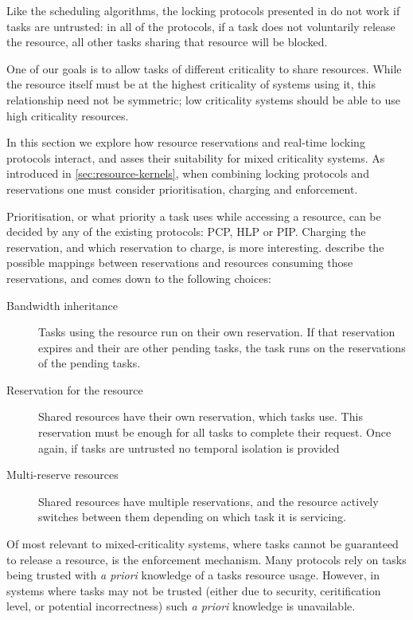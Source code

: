 Like the scheduling algorithms, the locking protocols presented in  do not work if tasks are untrusted: in all of the protocols, if a task does not voluntarily release the resource, all other tasks sharing that resource will be blocked.

One of our goals is to allow tasks of different criticality to share resources. 
While the resource itself must be at the highest criticality of systems using it, this relationship need not be symmetric; low criticality systems should be able to use high criticality resources.

In this section we explore how resource reservations and real-time locking protocols interact, and asses their suitability for mixed criticality systems.
As introduced in \cref{sec:resource-kernels}, when combining locking protocols and reservations one must consider prioritisation, charging and enforcement.

Prioritisation, or what priority a task uses while accessing a resource, can be decided by any of the existing protocols: \gls{PCP}, \gls{HLP} or \gls{PIP}. 
Charging the reservation, and which reservation to charge, is more interesting. 
\citet{deNiz_LSR_2001} describe the possible mappings between reservations and resources consuming those reservations, and comes down to the following choices:

\begin{description}
\item[Bandwidth inheritance] Tasks using the resource run on their own reservation.
If that reservation expires and their are other pending tasks, the task runs on the reservations of the pending tasks. 
\item[Reservation for the resource] Shared resources have their own reservation, which tasks use.
This reservation must be enough for all tasks to complete their request. 
Once again, if tasks are untrusted no temporal isolation is provided 
\item[Multi-reserve resources] Shared resources have multiple reservations, and the resource actively switches between them depending on which task it is servicing. 
\end{description} 

Of most relevant to mixed-criticality systems, where tasks cannot be guaranteed to release a resource, is the enforcement mechanism.
Many protocols rely on tasks being trusted with \emph{a priori} knowledge of a tasks resource usage. 
However, in systems where tasks may not be trusted (either due to security, ceritification level, or potential incorrectness) such \emph{a priori} knowledge is unavailable. 

